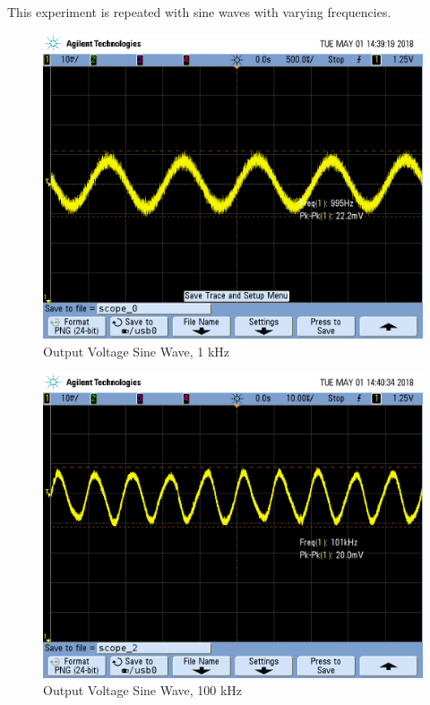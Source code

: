 \FloatBarrier

This experiment is repeated with sine waves with varying frequencies.

\FloatBarrier

\begin{figure}[h!]
	\centering
	\includegraphics[scale=0.3]{./images/SCOPE_0.PNG}
	\caption{Output Voltage Sine Wave, 1 \si{\kilo\hertz}}
	\label{fig:1khz_original}
\end{figure}

\FloatBarrier

\begin{figure}[h!]
	\centering
	\includegraphics[scale=0.3]{./images/SCOPE_2.PNG}
	\caption{Output Voltage Sine Wave, 100 \si{\kilo\hertz}}
	\label{fig:100khz_original}
\end{figure}

